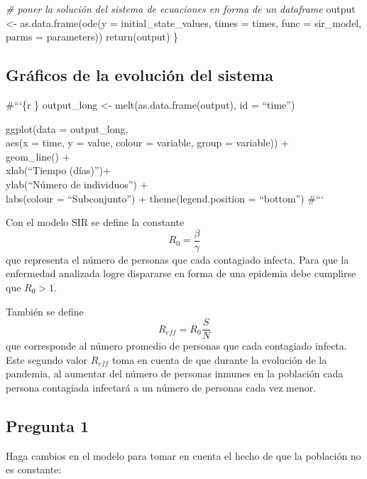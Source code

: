 \documentclass[
]{article}
\newenvironment{Shaded}{\begin{snugshade}}{\end{snugshade}}
\newcommand{\AttributeTok}[1]{\textcolor[rgb]{0.77,0.63,0.00}{#1}}
\newcommand{\CommentTok}[1]{\textcolor[rgb]{0.56,0.35,0.01}{\textit{#1}}}
\newcommand{\FunctionTok}[1]{\textcolor[rgb]{0.00,0.00,0.00}{#1}}
\newcommand{\NormalTok}[1]{#1}
\newcommand{\OtherTok}[1]{\textcolor[rgb]{0.56,0.35,0.01}{#1}}
\begin{document}
\begin{Shaded}
\begin{Highlighting}[]
\CommentTok{\# poner la solución del sistema de ecuaciones en forma de un dataframe}
\NormalTok{output }\OtherTok{\textless{}{-}} \FunctionTok{as.data.frame}\NormalTok{(}\FunctionTok{ode}\NormalTok{(}\AttributeTok{y =}\NormalTok{ initial\_state\_values, }
                            \AttributeTok{times =}\NormalTok{ times, }
                            \AttributeTok{func =}\NormalTok{ sir\_model,}
                            \AttributeTok{parms =}\NormalTok{ parameters))}
\FunctionTok{return}\NormalTok{(output)}
\NormalTok{\}}
\end{Highlighting}
\end{Shaded}

\hypertarget{gruxe1ficos-de-la-evoluciuxf3n-del-sistema}{%
\subsection{Gráficos de la evolución del
sistema}\label{gruxe1ficos-de-la-evoluciuxf3n-del-sistema}}

\#```\{r \} output\_long \textless- melt(as.data.frame(output), id =
``time'')

ggplot(data = output\_long,\\
aes(x = time, y = value, colour = variable, group = variable)) +\\
geom\_line() +\\
xlab(``Tiempo (días)'')+\\
ylab(``Número de individuos'') +\\
labs(colour = ``Subconjunto'') + theme(legend.position = ``bottom'')
\#```

Con el modelo SIR se define la constante \[R_0=\frac{\beta}{\gamma}\]
que representa el número de personas que cada contagiado infecta. Para
que la enfermedad analizada logre dispararse en forma de una epidemia
debe cumplirse que \(R_0 > 1\).

También se define \[R_{eff}=R_0\frac{S}{N}\] que corresponde al número
promedio de personas que cada contagiado infecta. Este segundo valor
\(R_{eff}\) toma en cuenta de que durante la evolución de la pandemia,
al aumentar del número de personas inmunes en la población cada persona
contagiada infectará a un número de personas cada vez menor.

\hypertarget{pregunta-1}{%
\subsection{Pregunta 1}\label{pregunta-1}}

Haga cambios en el modelo para tomar en cuenta el hecho de que la
población no es constante:
\end{document}
